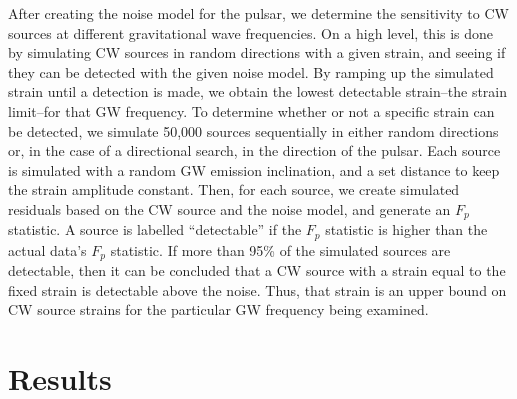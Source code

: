 \documentclass[12pt]{article}
\begin{document}
After creating the noise model for the pulsar, we determine the sensitivity to
CW sources at different gravitational wave frequencies. On a high level, this
is done by simulating CW sources in random directions with a given strain, and
seeing if they can be detected with the given noise model. By ramping up the
simulated strain until a detection is made, we obtain the lowest detectable
strain--the strain limit--for that GW frequency. To determine whether or not a
specific strain can be detected, we simulate 50,000 sources sequentially in
either random directions or, in the case of a directional search, in the
direction of the pulsar. Each source is simulated with a random GW emission inclination,
and a set distance to keep the strain amplitude constant. Then, for each
source, we create simulated residuals based on the CW source and the noise
model, and generate an $F_p$ statistic. A source is labelled ``detectable'' if the
$F_p$ statistic is higher than the actual data's $F_p$ statistic. If more than 95\% of
the simulated sources are detectable, then it can be concluded that a CW source
with a strain equal to the fixed strain is detectable above the noise. Thus,
that strain is an upper bound on CW source strains for the particular GW
frequency being examined.

\section{Results}
\end{document}
